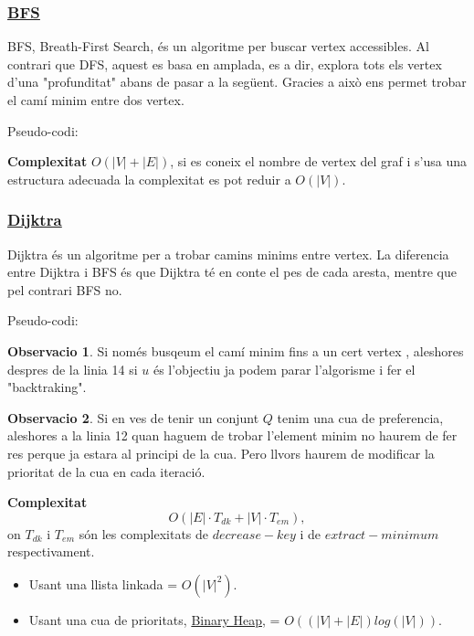 \documentclass[12pt]{article}
\theoremstyle{definition}
\theoremstyle{definition}
\theoremstyle{definition}
\newtheorem{obs}{Observacio}
\theoremstyle{definition}
\theoremstyle{definition}
\theoremstyle{definition}
\theoremstyle{definition}
\begin{document}
\subsubsection{\href{https://en.wikipedia.org/wiki/Breadth-first_search}{\color{blue}\underline{BFS}}}
BFS, Breath-First Search, és un algoritme per buscar vertex accessibles.
Al contrari que DFS, aquest es basa en amplada, es a dir, explora tots els vertex d'una "profunditat" abans de pasar a la següent.
Gracies a això ens permet trobar el camí minim entre dos vertex.

Pseudo-codi:


\textbf{Complexitat} $O(|V|+|E|)$, si es coneix el nombre de vertex del graf i s'usa una estructura adecuada la complexitat es pot reduir a $O(|V|)$.

\newpage

\subsubsection{\href{http://tiny.cc/6dd7fz}{\color{blue}\underline{Dijktra}}}
Dijktra és un algoritme per a trobar camins minims entre vertex.
La diferencia entre Dijktra i BFS és que Dijktra té en conte el pes de cada aresta, mentre que pel contrari BFS no.

Pseudo-codi:


\begin{obs}
Si només busqeum el camí minim fins a un cert vertex , aleshores despres de la linia 14 si $u$ és l'objectiu ja podem parar l'algorisme i fer el "backtraking".
\end{obs}

\begin{obs}
Si en ves de tenir un conjunt $Q$ tenim una cua de preferencia, aleshores a la linia 12 quan haguem de trobar l'element minim no haurem de fer res perque ja estara al principi de la cua. Pero llvors haurem de modificar la prioritat de la cua en cada iteració.
\end{obs}

\textbf{Complexitat}
\[
O(|E|\cdot T_{dk}+|V|\cdot T_{em}),
\]
on $T_{dk}$ i $T_{em}$ són les complexitats de $decrease-key$ i de $extract-minimum$ respectivament.
\begin{itemize}
	\item Usant una llista linkada = $O(|V|^2)$.
	\item Usant una cua de prioritats, \href{https://en.wikipedia.org/wiki/Binary_heap}{\color{blue}Binary Heap}, = $O((|V|+|E|)log(|V|))$.
\end{itemize}
\end{document}
